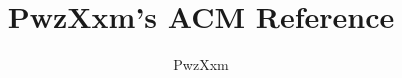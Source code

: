 \documentclass[twocolumn,a4paper,twoside,11pt]{article}
\title{\bfseries PwzXxm's ACM Reference}
\author{PwzXxm}
\begin{document}
\small
\begin{titlepage}
    \maketitle
\end{titlepage}

\newpage
\pagestyle{empty}
\tableofcontents
\newpage
\clearpage
\newpage
\pagestyle{fancy}
\setcounter{page}{1}

  
\end{document}
